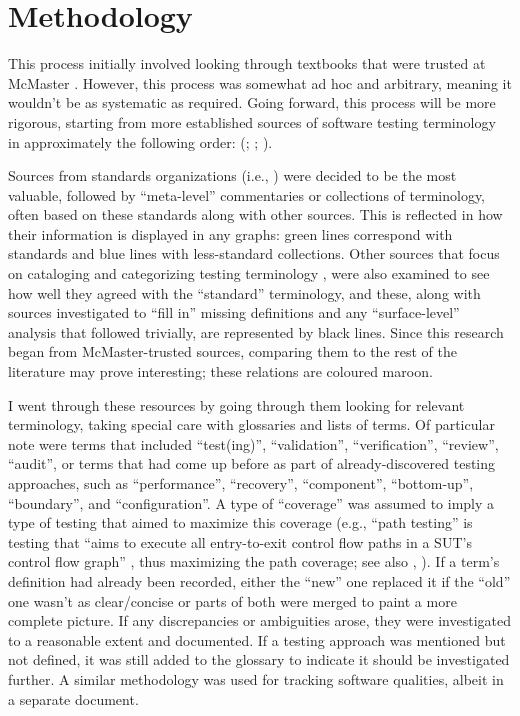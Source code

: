 \section{Methodology}
\label{method}

This process initially involved looking through textbooks that were trusted at
McMaster \citep{Patton2006, PetersAndPedrycz2000, vanVliet2000}. However, this
process was somewhat ad hoc and arbitrary, meaning it wouldn't be as systematic
as required. Going forward, this process will be more rigorous, starting from
more established sources of software testing terminology in approximately the
following order:
(\citealp{IEEE2022, SWEBOK2024, SWEBOK2014, IEEE2017, IEEE2013, ISO_IEC2023b,
      IEEE2012, ISO_IEC2023a}; \citealpISTQB{}; \citealp{Firesmith2015, IEEE2021}).

Sources from standards organizations (i.e., \citeauthor{IEEE2022}) were decided
to be the most valuable, followed by ``meta-level'' commentaries or collections
of terminology, often based on these standards along with other sources. This
is reflected in how their information is displayed in any graphs: green lines
correspond with standards and blue lines with less-standard collections.
Other sources that focus on cataloging and categorizing testing terminology
\citep[e.g.,][]{KuļešovsEtAl2013}, were also examined to see how well they
agreed with the ``standard'' terminology, and these, along with sources
investigated to ``fill in'' missing definitions
and any ``surface-level'' analysis that followed trivially, are represented by
black lines. Since this research began from McMaster-trusted sources, comparing
them to the rest of the literature may prove interesting; these relations are
coloured maroon.

I went through these resources by going through them looking for relevant
terminology, taking special care with glossaries and lists of terms. Of
particular note were terms that included ``test(ing)'', ``validation'',
``verification'', ``review'', ``audit'', or terms that had come up before
as part of already-discovered testing approaches, such as ``performance'',
``recovery'', ``component'', ``bottom-up'', ``boundary'', and ``configuration''.
A type of ``coverage'' was assumed to imply a type of testing that aimed to
maximize this coverage (e.g., ``path testing'' is testing that ``aims to
execute all entry-to-exit control flow paths in a SUT's control flow graph''
\citep[p.~5013]{SWEBOK2024}, thus maximizing the path coverage; see also
, \citet[Fig.~1]{SharmaEtAl2021}).
If a term's definition had already been recorded, either the ``new'' one
replaced it if the ``old'' one wasn't as clear/concise or parts of both were
merged to paint a more complete picture. If any discrepancies or ambiguities
arose, they were investigated to a reasonable extent and documented. If a
testing approach was mentioned but not defined, it was still added to the
glossary to indicate it should be investigated further. A similar methodology
was used for tracking software qualities, albeit in a separate
document.

